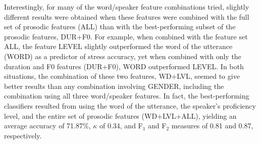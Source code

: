 		
		
		
		Interestingly, for many of the word/speaker feature combinations tried, 
		slightly %
		different results were
		obtained when these features were combined with the full set of prosodic features (ALL) than with the best-performing subset of the prosodic features, DUR+F0.
		For example, when combined with the feature set ALL, the feature LEVEL slightly outperformed the word of the utterance (WORD) as a predictor of stress accuracy, yet when combined with only the duration and F0 features (DUR+F0), WORD outperformed LEVEL. In both situations, the combination of these two features, WD+LVL, seemed to give better results than any combination involving GENDER, including the combination using all three word/speaker features. In fact, the best-performing classifiers 
		resulted from using the word of the utterance, the speaker's proficiency level, and the entire set of prosodic features (WD+LVL+ALL), yielding an average accuracy of 71.87\%, $\kappa$ of 0.34, and F$_1$ and F$_2$ measures of 0.81 and 0.87, respectively.
		
		
		
